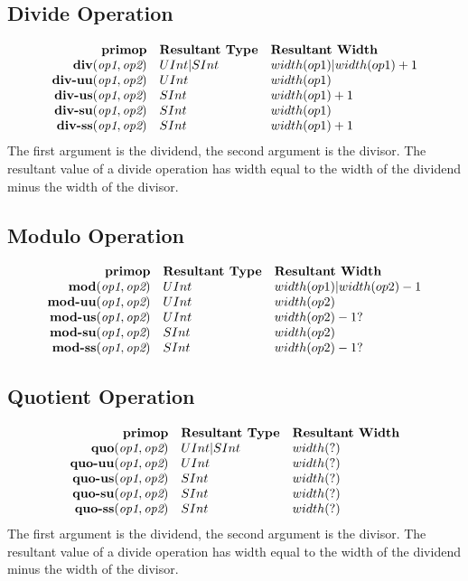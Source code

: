 \documentclass[12pt]{article}
\begin{document}
\subsection{Divide Operation}
\[
\begin{array}{rll}
\text{\bf primop} & \text{\bf Resultant Type} & \text{\bf Resultant Width} \\
\text{\bf div}(   \text{\em op1}, \text{\em op2}) & UInt|SInt & width(op1)|width(op1) + 1  \\
\text{\bf div-uu}(\text{\em op1}, \text{\em op2}) &   UInt & width(op1)     \\
\text{\bf div-us}(\text{\em op1}, \text{\em op2}) &   SInt & width(op1) + 1  \\
\text{\bf div-su}(\text{\em op1}, \text{\em op2}) &   SInt & width(op1)     \\
\text{\bf div-ss}(\text{\em op1}, \text{\em op2}) &   SInt & width(op1) + 1  \\
\end{array}
\]
The first argument is the dividend, the second argument is the divisor.
The resultant value of a divide operation has width equal to the width of the dividend minus the width of the divisor.

\subsection{Modulo Operation}
\[
\begin{array}{rll}
\text{\bf primop} & \text{\bf Resultant Type} & \text{\bf Resultant Width} \\
\text{\bf mod}(   \text{\em op1}, \text{\em op2}) &   UInt & width(op1)|width(op2) - 1  \\
\text{\bf mod-uu}(\text{\em op1}, \text{\em op2}) &   UInt & width(op2)     \\
\text{\bf mod-us}(\text{\em op1}, \text{\em op2}) &   UInt & width(op2) - 1?  \\
\text{\bf mod-su}(\text{\em op1}, \text{\em op2}) &   SInt & width(op2)     \\
\text{\bf mod-ss}(\text{\em op1}, \text{\em op2}) &   SInt & width(op2) - 1?  \\
\end{array}
\]

\subsection{Quotient Operation}
\[
\begin{array}{rll}
\text{\bf primop} & \text{\bf Resultant Type} & \text{\bf Resultant Width} \\
\text{\bf quo}(   \text{\em op1}, \text{\em op2}) & UInt|SInt & width(?)  \\
\text{\bf quo-uu}(\text{\em op1}, \text{\em op2}) &   UInt & width(?)     \\
\text{\bf quo-us}(\text{\em op1}, \text{\em op2}) &   SInt & width(?)   \\
\text{\bf quo-su}(\text{\em op1}, \text{\em op2}) &   SInt & width(?)     \\
\text{\bf quo-ss}(\text{\em op1}, \text{\em op2}) &   SInt & width(?)   \\
\end{array}
\]
The first argument is the dividend, the second argument is the divisor.
The resultant value of a divide operation has width equal to the width of the dividend minus the width of the divisor.
\end{document}
